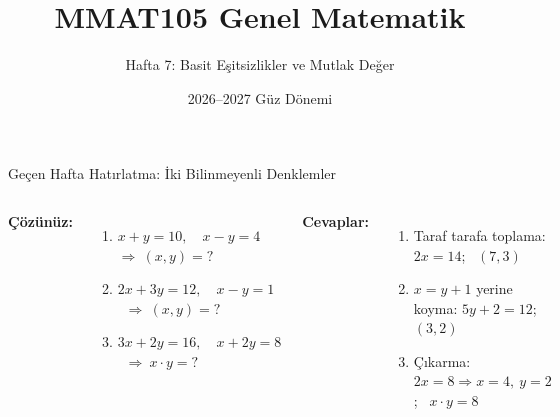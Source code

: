 \documentclass[aspectratio=169,11pt,handout]{beamer}
\title[MMAT105 -- Hafta 7]{MMAT105 Genel Matematik}
\subtitle{Hafta 7: Basit Eşitsizlikler ve Mutlak Değer}
\author{}
\date{2026--2027 Güz Dönemi}
\begin{document}
\begin{frame}
\titlepage
\end{frame}


\begin{frame}{Geçen Hafta Hatırlatma: İki Bilinmeyenli Denklemler}
\begin{columns}[t]
\textbf{Çözünüz:}
\begin{enumerate}
\item \(x+y=10,\quad x-y=4\) \ \(\Rightarrow\ (x,y)=?\)
\item \(2x+3y=12,\quad x-y=1\) \ \(\Rightarrow\ (x,y)=?\)
\item \(3x+2y=16,\quad x+2y=8\) \ \(\Rightarrow\ x\cdot y=?\)
\end{enumerate}
\pause
\textbf{Cevaplar:}
\begin{enumerate}
\item Taraf tarafa toplama: \(2x=14\); \ \((7,3)\)
\item \(x=y+1\) yerine koyma: \(5y+2=12\); \ \((3,2)\)
\item Çıkarma: \(2x=8\Rightarrow x=4,\ y=2\); \ \(x\cdot y=8\)
\end{enumerate}
\end{columns}
\end{frame}
\end{document}
